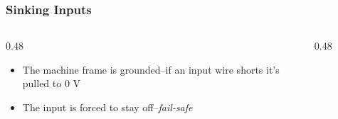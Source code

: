 \begin{frame}
    \frametitle{Sinking Inputs}

    \begin{columns}
        \begin{column}{0.48\linewidth}
            \begin{itemize}
                \item The machine frame is grounded--if an input wire shorts it's pulled to 0 V
                \item The input is forced to stay off--\emph{fail-safe}
            \end{itemize}
        \end{column}
        \begin{column}{0.48\linewidth}
            \begin{figure}
                \centering
                \resizebox{0.75\columnwidth}{!}{
                    
                }
            \end{figure}

            \vspace{0.5em}

            \begin{figure}
                \centering
                \resizebox{0.75\columnwidth}{!}{
                    
                }
            \end{figure}            
        \end{column}
    \end{columns}
\end{frame}

